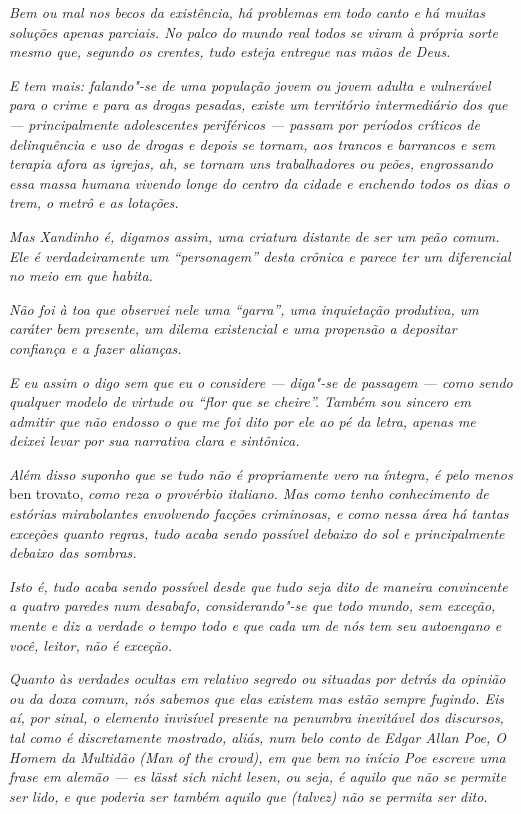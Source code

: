 \emph{Bem ou mal nos becos da existência, há problemas em todo canto e
há muitas soluções apenas parciais. No palco do mundo real todos se
viram à própria sorte mesmo que, segundo os crentes, tudo esteja
entregue nas mãos de Deus.}

\emph{E tem mais: falando"-se de uma população jovem ou jovem adulta e
vulnerável para o crime e para as drogas pesadas, existe um território
intermediário dos que --- principalmente adolescentes periféricos ---
passam por períodos críticos de delinquência e uso de drogas e depois se
tornam, aos trancos e barrancos e sem terapia afora as igrejas, ah, se
tornam uns trabalhadores ou peões, engrossando essa massa humana vivendo
longe do centro da cidade e enchendo todos os dias o trem, o metrô e as
lotações.}

\emph{Mas Xandinho é, digamos assim, uma criatura distante de ser um
peão comum. Ele é verdadeiramente um ``personagem'' desta crônica e
parece ter um diferencial no meio em que habita.}

\emph{Não foi à toa que observei nele uma ``garra'', uma inquietação
produtiva, um caráter bem presente, um dilema existencial e uma
propensão a depositar confiança e a fazer alianças.}

\emph{E eu assim o digo sem que eu o considere --- diga"-se de passagem
--- como sendo qualquer modelo de virtude ou ``flor que se cheire''.
Também sou sincero em admitir que não endosso o que me foi dito por ele
ao pé da letra, apenas me deixei levar por sua narrativa clara e
sintônica.}

\emph{Além disso suponho que se tudo não é propriamente vero na íntegra,
é pelo menos} ben trovato, \emph{como reza o provérbio italiano. Mas como tenho
conhecimento de estórias mirabolantes envolvendo facções criminosas, e
como nessa área há tantas exceções quanto regras, tudo acaba sendo
possível debaixo do sol e principalmente debaixo das sombras.}

\emph{Isto é, tudo acaba sendo possível desde que tudo seja dito de
maneira convincente a quatro paredes num desabafo, considerando"-se que
todo mundo, sem exceção, mente e diz a verdade o tempo todo e que cada
um de nós tem seu autoengano e você, leitor, não é exceção.}

\emph{Quanto às verdades ocultas em relativo segredo ou situadas por
detrás da opinião ou da doxa comum, nós sabemos que elas existem mas
estão sempre fugindo. Eis aí, por sinal, o elemento invisível presente
na penumbra inevitável dos discursos, tal como é discretamente mostrado,
aliás, num belo conto de Edgar Allan Poe, O Homem da Multidão (Man of
the crowd), em que bem no início Poe escreve uma frase em alemão --- es
lässt sich nicht lesen, ou seja, é aquilo que não se permite ser lido, e
que poderia ser também aquilo que (talvez) não se permita ser dito.}

